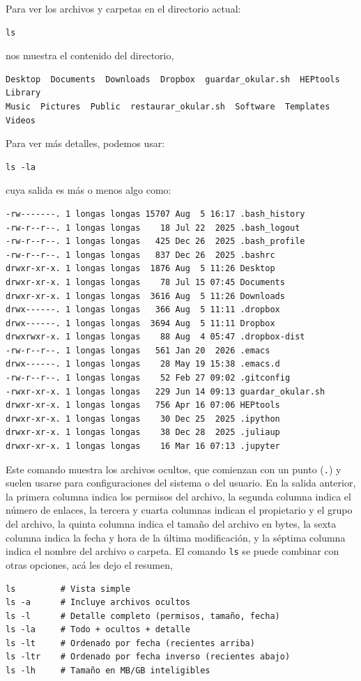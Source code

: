 \documentclass[12pt]{article}
\begin{document}
Para ver los archivos y carpetas en el directorio actual:
\begin{lstlisting}
ls
\end{lstlisting}
nos muestra el contenido del directorio,
\begin{lstlisting}
Desktop  Documents  Downloads  Dropbox  guardar_okular.sh  HEPtools  Library  
Music  Pictures  Public  restaurar_okular.sh  Software  Templates  Videos
\end{lstlisting}
Para ver más detalles, podemos usar:
\begin{lstlisting}
ls -la
\end{lstlisting}    
cuya salida es más o menos algo como:
\begin{lstlisting}
-rw-------. 1 longas longas 15707 Aug  5 16:17 .bash_history
-rw-r--r--. 1 longas longas    18 Jul 22  2025 .bash_logout
-rw-r--r--. 1 longas longas   425 Dec 26  2025 .bash_profile
-rw-r--r--. 1 longas longas   837 Dec 26  2025 .bashrc
drwxr-xr-x. 1 longas longas  1876 Aug  5 11:26 Desktop
drwxr-xr-x. 1 longas longas    78 Jul 15 07:45 Documents
drwxr-xr-x. 1 longas longas  3616 Aug  5 11:26 Downloads
drwx------. 1 longas longas   366 Aug  5 11:11 .dropbox
drwx------. 1 longas longas  3694 Aug  5 11:11 Dropbox
drwxrwxr-x. 1 longas longas    88 Aug  4 05:47 .dropbox-dist
-rw-r--r--. 1 longas longas   561 Jan 20  2026 .emacs
drwx------. 1 longas longas    28 May 19 15:38 .emacs.d
-rw-r--r--. 1 longas longas    52 Feb 27 09:02 .gitconfig
-rwxr-xr-x. 1 longas longas   229 Jun 14 09:13 guardar_okular.sh
drwxr-xr-x. 1 longas longas   756 Apr 16 07:06 HEPtools
drwxr-xr-x. 1 longas longas    30 Dec 25  2025 .ipython
drwxr-xr-x. 1 longas longas    38 Dec 28  2025 .juliaup
drwxr-xr-x. 1 longas longas    16 Mar 16 07:13 .jupyter
\end{lstlisting} 
Este comando muestra los archivos ocultos, que comienzan con un punto (\texttt{.}) y suelen usarse para 
configuraciones del sistema o del usuario. En la salida anterior, la primera columna indica los permisos 
del archivo, la segunda columna indica el número de enlaces, la tercera y cuarta columnas indican el
propietario y el grupo del archivo, la quinta columna indica el tamaño del archivo en bytes, 
la sexta columna indica la fecha y hora de la última modificación, 
y la séptima columna indica el nombre del archivo o carpeta. El comando  \lstinline|ls| se puede combinar
con otras opciones, acá les dejo el resumen,
\begin{lstlisting}
ls         # Vista simple
ls -a      # Incluye archivos ocultos
ls -l      # Detalle completo (permisos, tamaño, fecha)
ls -la     # Todo + ocultos + detalle
ls -lt     # Ordenado por fecha (recientes arriba)
ls -ltr    # Ordenado por fecha inverso (recientes abajo)
ls -lh     # Tamaño en MB/GB inteligibles
\end{lstlisting}
\end{document}
